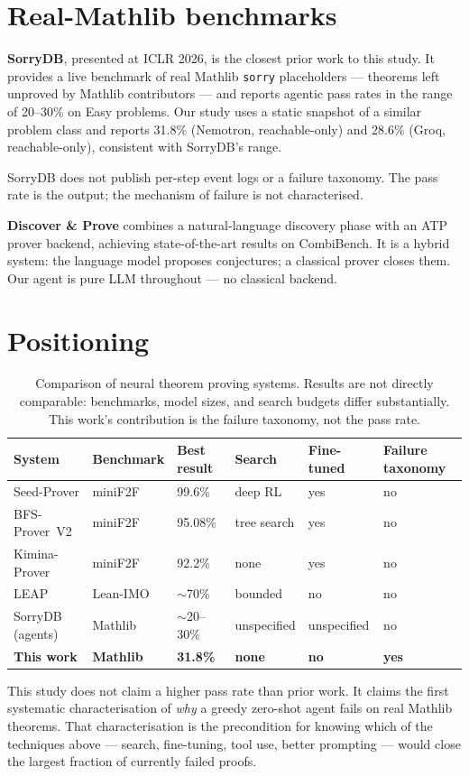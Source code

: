 \section{Real-Mathlib benchmarks}

\textbf{SorryDB}, presented at ICLR 2026, is the closest prior work
to this study.
It provides a live benchmark of real Mathlib \texttt{sorry} placeholders ---
theorems left unproved by Mathlib contributors --- and reports agentic pass rates
in the range of 20--30\% on Easy problems.
Our study uses a static snapshot of a similar problem class and reports
31.8\% (Nemotron, reachable-only) and 28.6\% (Groq, reachable-only),
consistent with SorryDB's range.

SorryDB does not publish per-step event logs or a failure taxonomy.
The pass rate is the output; the mechanism of failure is not characterised.

\textbf{Discover \& Prove} combines a natural-language discovery
phase with an ATP prover backend, achieving state-of-the-art results on CombiBench.
It is a hybrid system: the language model proposes conjectures;
a classical prover closes them.
Our agent is pure LLM throughout --- no classical backend.

\section{Positioning}

\begin{table}[h]
\centering
\begin{tabular}{llllll}
\hline
\textbf{System} & \textbf{Benchmark} & \textbf{Best result} & \textbf{Search} &
\textbf{Fine-tuned} & \textbf{Failure taxonomy} \\
\hline
Seed-Prover      & miniF2F     & 99.6\%  & deep RL      & yes & no \\
BFS-Prover~V2    & miniF2F     & 95.08\% & tree search  & yes & no \\
Kimina-Prover    & miniF2F     & 92.2\%  & none         & yes & no \\
LEAP             & Lean-IMO    & $\sim$70\%  & bounded      & no  & no \\
SorryDB (agents) & Mathlib     & $\sim$20--30\% & unspecified & unspecified & no \\
\textbf{This work} & \textbf{Mathlib} & \textbf{31.8\%} & \textbf{none} & \textbf{no} & \textbf{yes} \\
\hline
\end{tabular}
\caption{Comparison of neural theorem proving systems. Results are not directly
comparable: benchmarks, model sizes, and search budgets differ substantially.
This work's contribution is the failure taxonomy, not the pass rate.}
\end{table}

This study does not claim a higher pass rate than prior work.
It claims the first systematic characterisation of \emph{why} a greedy zero-shot
agent fails on real Mathlib theorems.
That characterisation is the precondition for knowing which of the techniques above ---
search, fine-tuning, tool use, better prompting --- would close the largest
fraction of currently failed proofs.
